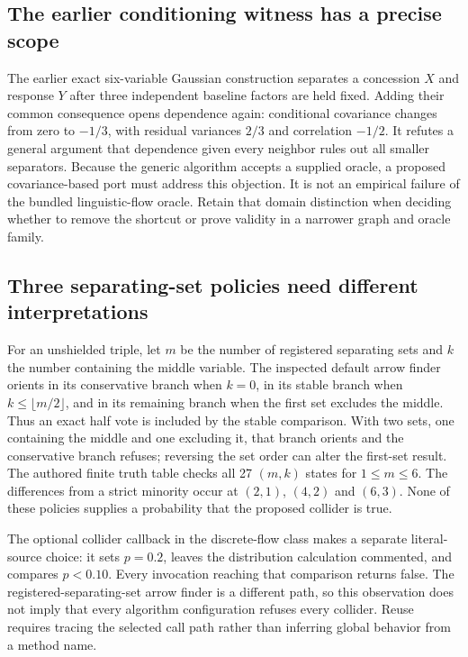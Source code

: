 \subsection{The earlier conditioning witness has a precise scope}
The earlier exact six-variable Gaussian construction separates a concession
$X$ and response $Y$ after three independent baseline factors are held fixed.
Adding their common consequence opens dependence again: conditional covariance
changes from zero to $-1/3$, with residual variances $2/3$ and correlation
$-1/2$. It refutes a general argument that dependence given every neighbor
rules out all smaller separators. Because the generic algorithm accepts a
supplied oracle, a proposed covariance-based port must address this objection.
It is not an empirical failure of the bundled linguistic-flow oracle. Retain
that domain distinction when deciding whether to remove the shortcut or prove
validity in a narrower graph and oracle family.
\citep{exec13_java_examples,exec13_java_aitiotita,exec28_fj_java}

\subsection{Three separating-set policies need different interpretations}
For an unshielded triple, let $m$ be the number of registered separating sets
and $k$ the number containing the middle variable. The inspected default
arrow finder orients in its conservative branch when $k=0$, in its stable
branch when $k\leq\lfloor m/2\rfloor$, and in its remaining branch when the
first set excludes the middle. Thus an exact half vote is included by the
stable comparison. With two sets, one containing the middle and one excluding
it, that branch orients and the conservative branch refuses; reversing the
set order can alter the first-set result. The authored finite truth table
checks all 27 $(m,k)$ states for $1\leq m\leq6$. The differences from a strict
minority occur at $(2,1)$, $(4,2)$ and $(6,3)$. None of these policies supplies
a probability that the proposed collider is true.\citep{exec28_fj_java,exec28_fj_reference}

The optional collider callback in the discrete-flow class makes a separate
literal-source choice: it sets $p=0.2$, leaves the distribution calculation
commented, and compares $p<0.10$. Every invocation reaching that comparison
returns false. The registered-separating-set arrow finder is a different
path, so this observation does not imply that every algorithm configuration
refuses every collider. Reuse requires tracing the selected call path rather
than inferring global behavior from a method name.\citep{exec28_fj_java}

